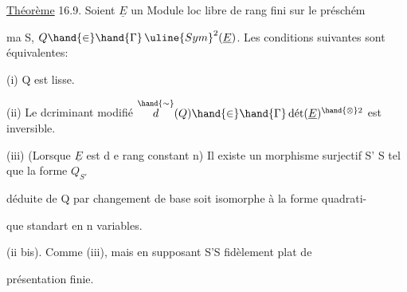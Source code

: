 \uline{Théorème} 16.9. Soient $\underline{E}$ un Module loc libre de rang fini sur le préschém

ma S, $Q \hand{\in}\hand{\Gamma}\,\uline{Sym}^2(\underline{E})$. Les conditions suivantes sont équivalentes:

(i) Q est lisse.

(ii) Le dcriminant modifié $\overset{\hand{\sim}}{d}(Q) \hand{\in}\hand{\Gamma}\,\text{dét}(\underline{E})^{\hand{\otimes}2}$ est inversible.

(iii) (Lorsque $\underline{E}$ est d e rang constant n) Il existe un morphisme surjectif S' \quad S tel que la forme $Q_{S'}$

déduite de Q par changement de base soit isomorphe à la forme quadrati-%

que standart en n variables.

(ii bis). Comme (iii), mais en supposant S'\hand{$\rightarrow$}S fidèlement plat de

présentation finie.

